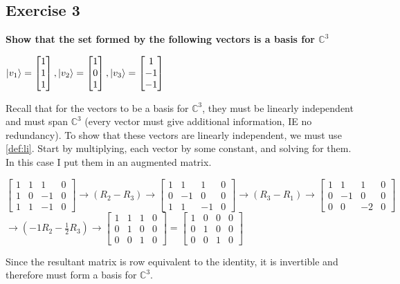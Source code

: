 \documentclass[12pt]{article}
\theoremstyle{plain}
\theoremstyle{nonumberplain}
\theoremstyle{plain}
\theoremstyle{nonumberplain}
\newcommand\1{{\bf 1}}
\newcommand{\bmat}[1]{\begin{bmatrix*} #1 \end{bmatrix*}} %
\newcommand{\C}{\mathbb{C}} %
\newcommand{\<}{\left\langle}
\renewcommand{\>}{\right\rangle}
\begin{document}
\subsection{Exercise 3}
\textbf{Show that the set formed by the following vectors is a basis for $\C^3$}
\begin{center}
$\ket{v_1}=\bmat{1 \\ 1 \\ 1}, \ket{v_2}=\bmat{1 \\ 0 \\ 1}, \ket{v_3}=\bmat{1 \\ -1 \\ -1}$
\end{center}
Recall that for the vectors to be a basis for $\C^3$, they must be linearly independent and must span
$\C^3$ (every vector must give additional information, IE no redundancy). To show that these vectors are linearly independent, we must use \ref{def:li}. Start by multiplying, each vector by some constant, and solving for them. In this case I put them in an augmented matrix. 
\begin{center}
$\bmat{1 & 1 & 1 & 0 \\ 1 & 0 & -1 & 0 \\ 1 & 1 & -1 & 0}\longrightarrow (R_2-R_3)\longrightarrow\bmat{1 & 1 & 1 & 0 \\ 0 & -1 & 0 & 0 \\ 1 & 1 & -1 & 0}\longrightarrow (R_3-R_1)\longrightarrow\bmat{1 & 1 & 1 & 0 \\ 0 & -1 & 0 & 0 \\ 0 & 0 & -2 & 0}$ \\
$\longrightarrow (-1R_2-\frac{1}{2}R_3)\longrightarrow\bmat{1 & 1 & 1 & 0 \\ 0 & 1 & 0 & 0 \\ 0 & 0 & 1 & 0}=\bmat{1 & 0 & 0 & 0 \\ 0 & 1 & 0 & 0 \\ 0 & 0 & 1 & 0}$
\end{center}
Since the resultant matrix is row equivalent to the identity, it is invertible and therefore must form a basis for $\C^3$.

\end{document}
